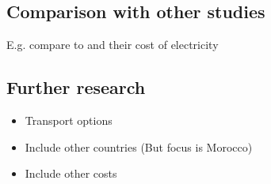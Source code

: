 \subsection{Comparison with other studies}
E.g. compare to \cite{Hampp2021} and their cost of electricity

\subsection{Further research}
\begin{itemize}
    \item Transport options
    \item Include other countries (But focus is Morocco)
    \item Include other costs
\end{itemize}